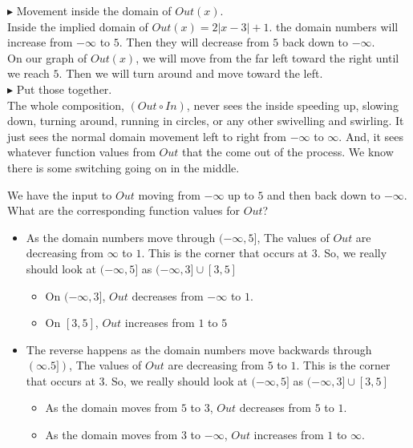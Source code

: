 \documentclass{ximera}
\begin{document}
$\blacktriangleright$ Movement inside the domain of $Out(x)$.\\



Inside the implied domain of $Out(x) =2|x-3|+1$. the domain numbers will increase from $-\infty$ to $5$.  Then they will decrease from $5$ back down to $-\infty$. \\

On our graph of $Out(x)$, we will move from the far left toward the right until we reach $5$.  Then we will turn around and move toward the left.\\



$\blacktriangleright$ Put those together. \\

The whole composition, $(Out \circ In)$, never sees the inside speeding up, slowing down, turning around, running in circles, or any other swivelling and swirling.  It just sees the normal domain movement left to right from $-\infty$ to $\infty$.  And, it sees whatever function values from $Out$ that the come out of the process.  We know there is some switching going on in the middle.

We have the input to $Out$ moving from $-\infty$ up to $5$ and then back down to $-\infty$.  What are the corresponding function values for $Out$?





\begin{itemize}

\item As the domain numbers move through $(-\infty, 5]$, The values of $Out$ are decreasing from $\infty$ to $1$.  This is the corner that occurs at $3$.  So, we really should look at $(-\infty, 5]$  as  $(-\infty, 3] \cup [3,5]$

	\begin{itemize}[label=$\star$]
		\item On $(-\infty, 3]$, $Out$ decreases from $-\infty$ to $1$.

		\item On $[3,5]$, $Out$ increases from $1$ to $5$

	\end{itemize}


\item The reverse happens as the domain numbers move backwards through $(\infty. 5])$, The values of $Out$ are decreasing from $5$ to $1$.  This is the corner that occurs at $3$.  So, we really should look at $(-\infty, 5]$  as  $(-\infty, 3] \cup [3,5]$

	\begin{itemize}[label=$\star$]
		\item As the domain moves from $5$ to $3$, $Out$ decreases from $5$ to $1$.

		\item As the domain moves from $3$ to $-\infty$, $Out$ increases from $1$ to $\infty$.

	\end{itemize}

\end{itemize}
\end{document}

